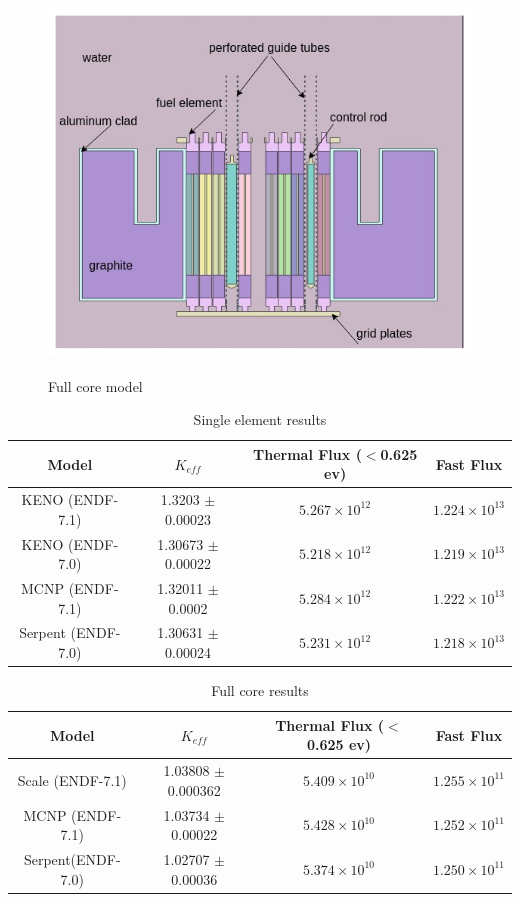 \documentclass[review,number,sort&compress,12pt]{elsarticle}
\begin{document}
\begin{figure}[h]
\centering
\includegraphics[scale=0.7]{full_core.jpg}\\
\caption{Full core model}
\label{fig:full_core_model}
\end{figure}


\begin{table}[h]
\centering
\caption{Single element results}
\label{single_rsults_keff}
\begin{tabular}{c c c c }
	\hline
	Model & $K_{eff}$ & Thermal Flux ($<$0.625 ev)& Fast Flux\\
	\hline
	KENO (ENDF-7.1)& 1.3203 $\pm$ 0.00023&  $5.267 \times 10^{12}$  & $1.224 \times 10^{13}$ \\
	KENO (ENDF-7.0) & 1.30673 $\pm$ 0.00022&  $5.218 \times 10^{12}$  & $1.219 \times 10^{13}$ \\
	MCNP (ENDF-7.1)& 1.32011 $\pm$ 0.0002 &  $5.284 \times 10^{12}$ & $1.222 \times 10^{13}$ \\
	Serpent (ENDF-7.0) &1.30631 $\pm$ 0.00024&  $5.231 \times 10 ^{12}$  & $1.218 \times 10 ^{13}$\\
\end{tabular}
\end{table}

\begin{table}[h]
\caption{Full core results}
\label{full_core_results_keff}
\begin{tabular}{c c c c }
	\hline
	Model & $K_{eff}$ & Thermal Flux ($<$0.625 ev)& Fast Flux \\
	\hline
	Scale (ENDF-7.1)& 1.03808 $\pm$  0.000362&  $5.409 \times 10^{10}$ & $1.255\times 10^{11}  $ \\
	MCNP (ENDF-7.1)& 1.03734   $\pm$ 0.00022 &  $5.428 \times 10^{10}$ & $1.252\times 10^{11}$\\
	Serpent(ENDF-7.0) & 1.02707  $\pm$  0.00036  & $5.374\times 10^{10}$ & $1.250\times 10^{11}$\\
\end{tabular}
\end{table}
\end{document}
